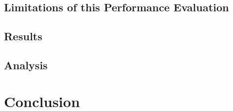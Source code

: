     

\subsection[Limitations]{Limitations of this Performance Evaluation}


\subsection{Results} \label{subsec:page_evictioners_results}

    

\subsection{Analysis} \label{subsec:page_evictioners_analysis}

    

\section{Conclusion} \label{sec:page_evictioners_outro}

    
